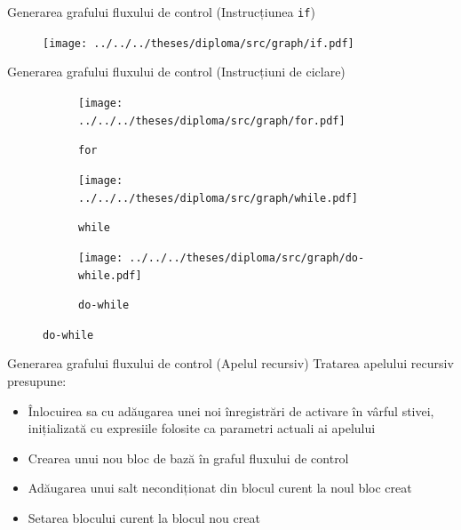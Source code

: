 \documentclass{beamer}
\def\code#1{\texttt{#1}}
\begin{document}
\begin{frame}{Generarea grafului fluxului de control (Instrucțiunea \code{if})}
    \begin{figure}[htb]
        \centering
        \texttt{[image: ../../../theses/diploma/src/graph/if.pdf]}
    \end{figure}
\end{frame}

\begin{frame}{Generarea grafului fluxului de control (Instrucțiuni de ciclare)}
    \begin{figure}[htb]
        \begin{subfigure}[b]{0.32\textwidth}
            \centering
            \texttt{[image: ../../../theses/diploma/src/graph/for.pdf]}
            \caption{\code{for}}
        \end{subfigure}
        \hfill
        \begin{subfigure}[b]{0.32\textwidth}
            \centering
            \texttt{[image: ../../../theses/diploma/src/graph/while.pdf]}
            \caption{\code{while}}
        \end{subfigure}
        \hfill
        \begin{subfigure}[b]{0.32\textwidth}
            \centering
            \texttt{[image: ../../../theses/diploma/src/graph/do-while.pdf]}
            \caption{\code{do-while}}
        \end{subfigure}
    \end{figure}
\end{frame}

\begin{frame}{Generarea grafului fluxului de control (Apelul recursiv)}
    Tratarea apelului recursiv presupune:
    \begin{itemize}
        \item Înlocuirea sa cu adăugarea unei noi înregistrări de activare în vârful stivei, inițializată cu
        expresiile folosite ca parametri actuali ai apelului
        \item Crearea unui nou bloc de bază în graful fluxului de control
        \item Adăugarea unui salt necondiționat din blocul curent la noul bloc creat
        \item Setarea blocului curent la blocul nou creat
    \end{itemize}
\end{frame}
\end{document}
